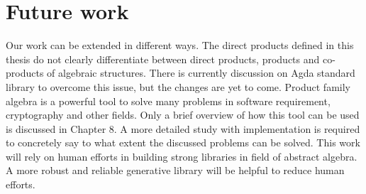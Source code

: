 \section{Future work}
\label{future}
Our work can be extended in different ways. The direct products defined in this
thesis do not clearly differentiate between direct products, products and
co-products of algebraic structures. There is currently discussion on Agda
standard library to overcome this issue, but the changes are yet to come. Product
family algebra is a powerful tool to solve many problems in software requirement,
cryptography and other fields. Only a brief overview of how this tool can be
used is discussed in Chapter 8. A more detailed study with implementation is
required to concretely say to what extent the discussed problems can be solved.
This work will rely on human efforts in building strong libraries in field of
abstract algebra. A more robust and reliable generative library will be helpful
to reduce human efforts. 